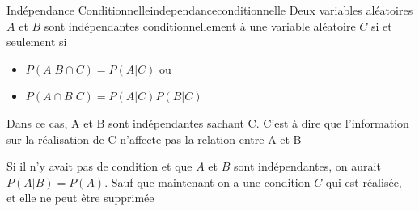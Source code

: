 \begin{definition}{Indépendance Conditionnelle}{independanceconditionnelle}
    Deux variables aléatoires $A$ et $B$ sont indépendantes conditionnellement à une variable aléatoire $C$ si et seulement si 
    \begin{itemize}
        \item $P(A | B \cap C) = P(A | C)$ ou 
        \item $P(A \cap B | C) = P(A | C)P(B | C)$
    \end{itemize}
    Dans ce cas, A et B sont indépendantes sachant C. C'est à dire que l'information sur la réalisation de C n'affecte pas la relation entre A et B
\end{definition}
\begin{remark}\leavevmode
    Si il n'y avait pas de condition et que $A$ et $B$ sont indépendantes, 
    on aurait $P(A | B) = P(A)$. Sauf que maintenant on a une condition $C$ qui est réalisée, et elle ne peut être supprimée
\end{remark}

